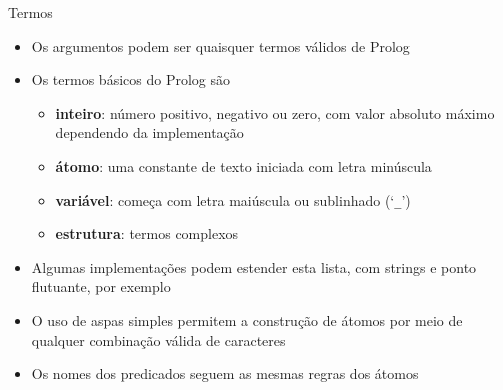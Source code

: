 \begin{frame}[fragile]{Termos}

    \begin{itemize}
        \item Os argumentos podem ser quaisquer termos válidos de Prolog

        \item Os termos básicos do Prolog são

        \begin{itemize}
            \item \textbf{inteiro}: número positivo, negativo ou zero, com valor absoluto 
                máximo dependendo da implementação

            \item \textbf{átomo}: uma constante de texto iniciada com letra minúscula

            \item \textbf{variável}: começa com letra maiúscula ou sublinhado (`\texttt{\_}')

            \item \textbf{estrutura}: termos complexos
        \end{itemize}

        \item Algumas implementações podem estender esta lista, com strings e ponto flutuante, 
            por exemplo

        \item O uso de aspas simples permitem a construção de átomos por meio de qualquer 
            combinação válida de caracteres

        \item Os nomes dos predicados seguem as mesmas regras dos átomos
    \end{itemize}

\end{frame}

